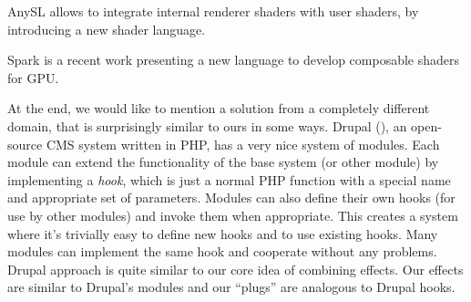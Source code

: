 \documentclass{egpubl}
\begin{document}
AnySL \cite{anysl} allows to integrate internal renderer shaders
with user shaders, by introducing a new shader language.

Spark \cite{spark} is a recent work presenting a new language to develop
composable shaders for GPU.


At the end, we would like to mention a solution from a completely
different domain, that is surprisingly similar to ours in some ways.
Drupal (),
an open-source CMS system written in PHP,
has a very nice system of modules. Each module
can extend the functionality of the base system (or other module)
by implementing a \textit{hook}, which is just a normal PHP function
with a special name and appropriate set of parameters. Modules can also define
their own hooks (for use by other modules) and invoke them when appropriate.
This creates a system where it's trivially easy to define new hooks
and to use existing hooks.
Many modules can implement the same hook and cooperate without any problems.
Drupal approach is quite similar to our
core idea of combining effects. Our effects are similar to
Drupal's modules and our ``plugs'' are analogous to Drupal hooks.
\end{document}
